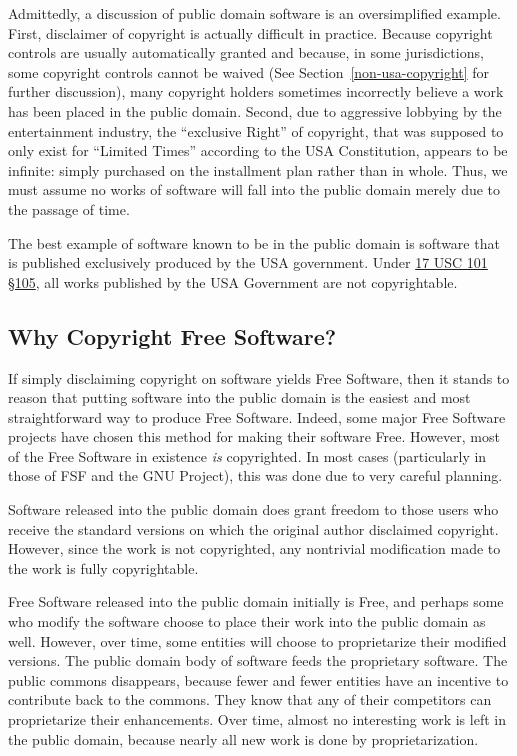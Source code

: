 Admittedly, a discussion of public domain software is an oversimplified
example.  First, disclaimer of copyright is actually difficult in practice.
Because copyright controls are usually automatically granted and because, in
some jurisdictions, some copyright controls cannot be waived (See
Section~\ref{non-usa-copyright} for further discussion), many copyright
holders sometimes incorrectly believe a work has been placed in the public
domain.  Second, due to aggressive lobbying by the entertainment industry,
the ``exclusive Right'' of copyright, that was supposed to only exist for
``Limited Times'' according to the USA Constitution, appears to be infinite:
simply purchased on the installment plan rather than in whole.  Thus, we must
assume no works of software will fall into the public domain merely due to
the passage of time.

The best example of software known to be in the public domain is software
that is published exclusively produced by the USA government.  Under
\href{http://www.law.cornell.edu/uscode/text/17/105}{17 USC 101 \S 105}, all
works published by the USA Government are not copyrightable.

\subsection{Why Copyright Free Software?}

If simply disclaiming copyright on software yields Free Software, then it
stands to reason that putting software into the public domain is the
easiest and most straightforward way to produce Free Software. Indeed,
some major Free Software projects have chosen this method for making their
software Free. However, most of the Free Software in existence \emph{is}
copyrighted. In most cases (particularly in those of FSF and the GNU
Project), this was done due to very careful planning.

Software released into the public domain does grant freedom to those users
who receive the standard versions on which the original author disclaimed
copyright. However, since the work is not copyrighted, any nontrivial
modification made to the work is fully copyrightable.

Free Software released into the public domain initially is Free, and
perhaps some who modify the software choose to place their work into the
public domain as well. However, over time, some entities will choose to
proprietarize their modified versions. The public domain body of software
feeds the proprietary software. The public commons disappears, because
fewer and fewer entities have an incentive to contribute back to the
commons. They know that any of their competitors can proprietarize their
enhancements. Over time, almost no interesting work is left in the public
domain, because nearly all new work is done by proprietarization.

